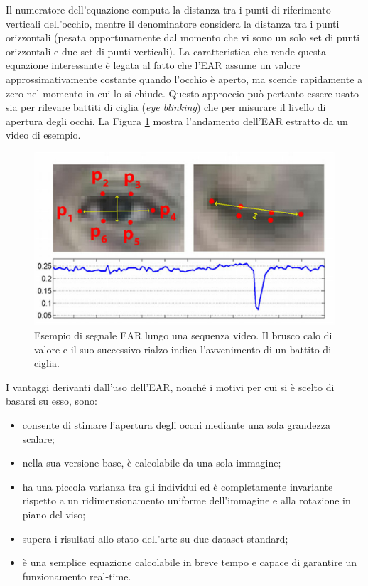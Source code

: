 \documentclass[12pt]{article}
\begin{document}
Il numeratore dell'equazione computa la distanza tra i punti di riferimento verticali dell'occhio, mentre il denominatore considera la distanza tra i punti orizzontali (pesata opportunamente dal momento che vi sono un solo set di punti orizzontali e due set di punti verticali). La caratteristica che rende questa equazione interessante è legata al fatto che l'EAR assume un valore approssimativamente costante quando l'occhio è aperto, ma scende rapidamente a zero nel momento in cui lo si chiude. Questo approccio può pertanto essere usato sia per rilevare battiti di ciglia (\textit{eye blinking}) che per misurare il livello di apertura degli occhi. La Figura \ref{fig:blink_detection_plot} mostra l'andamento dell'EAR estratto da un video di esempio.
\begin{figure}[!htb]
	\centering
	\includegraphics[scale=0.50]{eps/blink_detection_plot.eps}
	\caption{Esempio di segnale EAR lungo una sequenza video. Il brusco calo di valore e il suo successivo rialzo indica l'avvenimento di un battito di ciglia.}
	\label{fig:blink_detection_plot}
\end{figure}
I vantaggi derivanti dall'uso dell'EAR, nonché i motivi per cui si è scelto di basarsi su esso, sono:
\begin{itemize}
	\item consente di stimare l'apertura degli occhi mediante una sola grandezza scalare;
	\item nella sua versione base, è calcolabile da una sola immagine;
	\item ha una piccola varianza tra gli individui ed è completamente invariante rispetto a un ridimensionamento uniforme dell'immagine e alla rotazione in piano del viso;
	\item supera i risultati allo stato dell'arte su due dataset standard;
	\item è una semplice equazione calcolabile in breve tempo e capace di garantire un funzionamento real-time.
\end{itemize}
\end{document}
